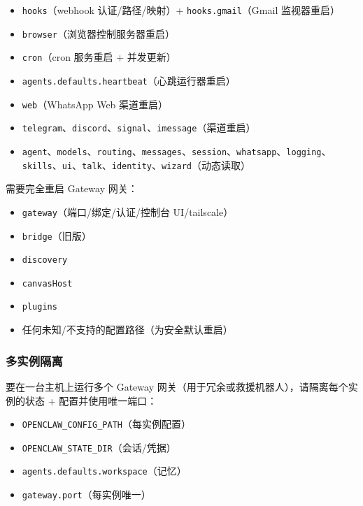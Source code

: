 \begin{itemize}
  \item \texttt{hooks}（webhook 认证/路径/映射）+ \texttt{hooks.gmail}（Gmail 监视器重启）
  \item \texttt{browser}（浏览器控制服务器重启）
  \item \texttt{cron}（cron 服务重启 + 并发更新）
  \item \texttt{agents.defaults.heartbeat}（心跳运行器重启）
  \item \texttt{web}（WhatsApp Web 渠道重启）
  \item \texttt{telegram}、\texttt{discord}、\texttt{signal}、\texttt{imessage}（渠道重启）
  \item \texttt{agent}、\texttt{models}、\texttt{routing}、\texttt{messages}、\texttt{session}、\texttt{whatsapp}、\texttt{logging}、\texttt{skills}、\texttt{ui}、\texttt{talk}、\texttt{identity}、\texttt{wizard}（动态读取）
\end{itemize}


需要完全重启 Gateway 网关：

\begin{itemize}
  \item \texttt{gateway}（端口/绑定/认证/控制台 UI/tailscale）
  \item \texttt{bridge}（旧版）
  \item \texttt{discovery}
  \item \texttt{canvasHost}
  \item \texttt{plugins}
  \item 任何未知/不支持的配置路径（为安全默认重启）
\end{itemize}


\subsubsection{多实例隔离}


要在一台主机上运行多个 Gateway 网关（用于冗余或救援机器人），请隔离每个实例的状态 + 配置并使用唯一端口：

\begin{itemize}
  \item \texttt{OPENCLAW\_CONFIG\_PATH}（每实例配置）
  \item \texttt{OPENCLAW\_STATE\_DIR}（会话/凭据）
  \item \texttt{agents.defaults.workspace}（记忆）
  \item \texttt{gateway.port}（每实例唯一）
\end{itemize}


